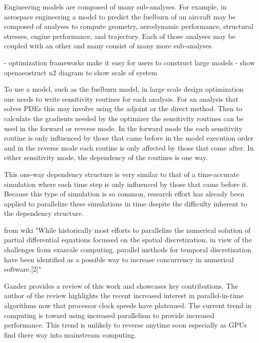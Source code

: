 \documentclass[conf]{new-aiaa}
\begin{document}
Engineering models are composed of many sub-analyses.
For example, in aerospace engineering a model to predict the fuelburn of an aircraft may be composed of analyses to compute geometry, aerodynamic performance, structural stresses, engine performance, and trajectory.
Each of those analyses may be coupled with an other and many consist of many more sub-analyses.

- optimization frameworks make it easy for users to construct large models
- show openaeostruct n2 diagram to show scale of system


To use a model, such as the fuelburn model, in large scale design optimization one needs to write sensitivity routines for each analysis.
For an analysis that solves PDEs this may involve using the adjoint or the direct method.
Then to calculate the gradients needed by the optimizer the sensitivity routines can be used in the forward or reverse mode.
In the forward mode the each sensitivity routine is only influenced by those that came before in the model execution order and in the reverse mode each routine is only affected by those that come after.
In either sensitivity mode, the dependency of the routines is one way.

This one-way dependency structure is very similar to that of a time-accurate simulation where each time step is only influenced by those that came before it.
Because this type of simulation is so common, research effort has already been applied to parallelize these simulations in time despite the difficulty inherent to the dependency structure.

from wiki
"While historically most efforts to parallelize the numerical solution of partial differential equations focussed on the spatial discretization, in view of the challenges from exascale computing, parallel methods for temporal discretization have been identified as a possible way to increase concurrency in numerical software.[2]"

Gander\cite{Gander2015} provides a review of this work and showcases key contributions.
The author of the review highlights the recent increased interest in parallel-in-time algorithms now that processor clock speeds have plateaued.
The current trend in computing is toward using increased parallelism to provide increased performance.
This trend is unlikely to reverse anytime soon especially as GPUs find there way into mainstream computing.
\end{document}
